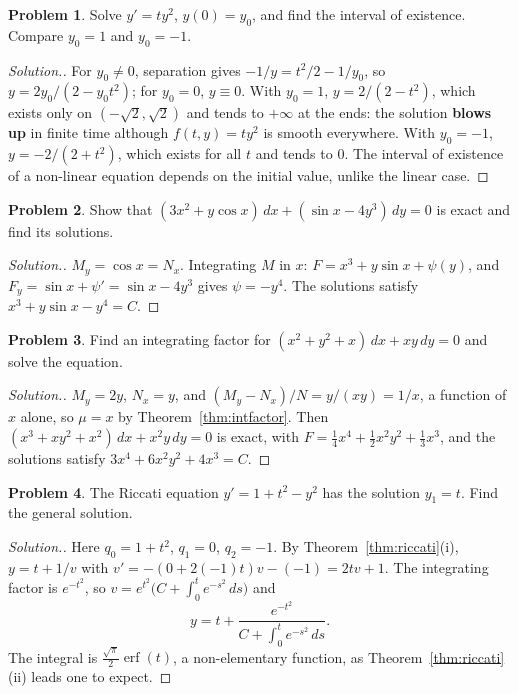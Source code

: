 \documentclass[11pt,a4paper]{article}
\numberwithin{equation}{section}
\theoremstyle{definition}
\newtheorem{problemx}{Problem}[subsection]
\newenvironment{problem}{\begin{problemx}}{\end{problemx}}
\newenvironment{solution}
  {\renewcommand{\qedsymbol}{}\begin{proof}[\textit{Solution}.]}
  {\end{proof}}
\begin{document}
\begin{problem}
\label{prob:blowup}
Solve $y' = t y^2$, $y(0) = y_0$, and find the interval of existence. Compare $y_0 = 1$ and $y_0 = -1$.
\end{problem}

\begin{solution}
For $y_0 \neq 0$, separation gives $-1/y = t^2/2 - 1/y_0$, so $y = 2y_0/(2 - y_0t^2)$; for $y_0 = 0$, $y \equiv 0$. With $y_0 = 1$, $y = 2/(2 - t^2)$, which exists only on $(-\sqrt2, \sqrt2)$ and tends to $+\infty$
at the ends: the solution \textbf{blows up} in finite time although $f(t, y) = ty^2$ is smooth everywhere. With $y_0 = -1$, $y = -2/(2 + t^2)$, which exists for all $t$ and tends to $0$. The
interval of existence of a non-linear equation depends on the initial value, unlike the linear case.
\end{solution}

\begin{problem}
Show that $(3x^2 + y\cos x)\,dx + (\sin x - 4y^3)\,dy = 0$ is exact and find its solutions.
\end{problem}

\begin{solution}
$M_y = \cos x = N_x$. Integrating $M$ in $x$: $F = x^3 + y\sin x + \psi(y)$, and $F_y = \sin x + \psi' = \sin x - 4y^3$ gives $\psi = -y^4$. The solutions satisfy $x^3 + y\sin x - y^4 = C$.
\end{solution}

\begin{problem}
Find an integrating factor for $(x^2 + y^2 + x)\,dx + xy\,dy = 0$ and solve the equation.
\end{problem}

\begin{solution}
$M_y = 2y$, $N_x = y$, and $(M_y - N_x)/N = y/(xy) = 1/x$, a function of $x$ alone, so $\mu = x$ by Theorem~\ref{thm:intfactor}. Then $(x^3 + xy^2 + x^2)\,dx + x^2y\,dy = 0$ is exact, with
$F = \frac14x^4 + \frac12x^2y^2 + \frac13x^3$, and the solutions satisfy $3x^4 + 6x^2y^2 + 4x^3 = C$.
\end{solution}

\begin{problem}
The Riccati equation $y' = 1 + t^2 - y^2$ has the solution $y_1 = t$. Find the general solution.
\end{problem}

\begin{solution}
Here $q_0 = 1 + t^2$, $q_1 = 0$, $q_2 = -1$. By Theorem~\ref{thm:riccati}(i), $y = t + 1/v$ with $v' = -(0 + 2(-1)t)v - (-1) = 2tv + 1$. The integrating factor is $e^{-t^2}$, so
$v = e^{t^2}\bigl(C + \int_0^te^{-s^2}\,ds\bigr)$ and
\[
y = t + \frac{e^{-t^2}}{C + \int_0^te^{-s^2}\,ds} .
\]
The integral is $\frac{\sqrt\pi}{2}\operatorname{erf}(t)$, a non-elementary function, as Theorem~\ref{thm:riccati}(ii) leads one to expect.
\end{solution}
\end{document}
